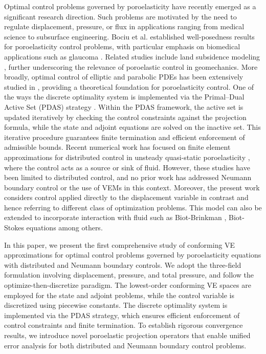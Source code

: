 \documentclass[smallextended]{svjour3}
\numberwithin{equation}{section}
\numberwithin{figure}{section}
\numberwithin{table}{section}
\begin{document}
    Optimal control problems governed by poroelasticity have recently emerged as a significant research direction. Such problems are motivated by the need to regulate displacement, pressure, or flux in applications ranging from medical science to subsurface engineering. Bociu et al. \cite{bociu22} established well-posedness results for poroelasticity control problems, with particular emphasis on biomedical applications such as glaucoma \cite{bociu22,causin14}. Related studies include land subsidence modeling \cite{xu12}, further underscoring the relevance of poroelastic control in geomechanics. More broadly, optimal control of elliptic and parabolic PDEs has been extensively studied in \cite{troltzsch10,manzoni21}, providing a theoretical foundation for poroelasticity control. One of the ways the discrete optimality system is implemented via the Primal–Dual Active Set (PDAS) strategy \cite{troltzsch10}. Within the PDAS framework, the active set is updated iteratively by checking the control constraints against the projection formula, while the state and adjoint equations are solved on the inactive set. This iterative procedure guarantees finite termination and efficient enforcement of admissible bounds. Recent numerical work has focused on finite element approximations for distributed control in unsteady quasi-static poroelasticity \cite{harpal26}, where the control acts as a source or sink of fluid. However, these studies have been limited to distributed control, and no prior work has addressed Neumann boundary control or the use of VEMs in this context. Moreover, the present work considers control applied directly to the displacement variable in contrast and hence referring to different class of optimization problems. This model can also be extended to incorporate interaction with fluid such as Biot-Brinkman \cite{ricardo24,verma26}, Biot-Stokes equations \cite{ricardo22} among others.
    
    In this paper, we present the first comprehensive study of conforming VE approximations for optimal control problems governed by poroelasticity equations with distributed and Neumann boundary controls. We adopt the three-field formulation involving displacement, pressure, and total pressure, and follow the optimize-then-discretize paradigm. The lowest-order conforming VE spaces are employed for the state and adjoint problems, while the control variable is discretized using piecewise constants. The discrete optimality system is implemented via the PDAS strategy, which ensures efficient enforcement of control constraints and finite termination. To establish rigorous convergence results, we introduce novel poroelastic projection operators that enable unified error analysis for both distributed and Neumann boundary control problems.
\end{document}
